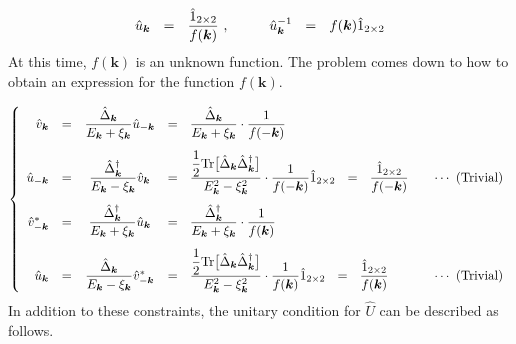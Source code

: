 \documentclass[uplatex,a4j,12pt,dvipdfmx]{jsarticle}
\begin{document}
\begin{eqnarray}
	\hat{u}_{\bm{k}}
	\ \ = \ \
	\dfrac{ \hat{1}_{2 \times 2} }{ f(\bm{k}) }
	\ ,
	\hspace{10mm}
	\hat{u}_{\bm{k}}^{-1}
	\ \ = \ \
	f({\bm{k}}) \hat{1}_{2 \times 2}
\end{eqnarray}
%
At this time, $f(\bm{k})$ is an unknown function.
The problem comes down to how to obtain an expression for the function $f(\bm{k})$.

\begin{eqnarray}
	\left\{
	\begin{array}{rccll}
		\hat{v}_{\bm{k}}
		 & =                               &
		\dfrac{ \hat{\Delta}_{\bm{k}} }{ E_{\bm{k}} + \xi_{\bm{k}} } \hat{u}_{-\bm{k}}
		 &
		= \ \
		\dfrac{ \hat{\Delta}_{\bm{k}} }{ E_{\bm{k}} + \xi_{\bm{k}} } \cdot \dfrac{1}{f(-\bm{k})}
		\\[5mm]
		\hat{u}_{-\bm{k}}
		 & =                               &
		\dfrac{ \hat{\Delta}^{\dagger}_{\bm{k}} }{ E_{\bm{k}} - \xi_{\bm{k}} } \hat{v}_{\bm{k}}
		 &
		= \ \
		\dfrac{ \dfrac{1}{2} {\rm Tr} \big[ \hat{\Delta}_{\bm{k}} \hat{\Delta}^{\dagger}_{\bm{k}} \big] }{ E^{2}_{\bm{k}} - \xi^{2}_{\bm{k}} } \cdot \dfrac{1}{f(-\bm{k})}
		\hat{1}_{2 \times 2}
		\ \ = \ \
		\dfrac{ \hat{1}_{2 \times 2} }{ f(-\bm{k}) }
		 & \ \ \ \cdots \ \text{(Trivial)}
		\\[5mm]
		\hat{v}_{-\bm{k}}^{*}
		 & =                               &
		\dfrac{ \hat{\Delta}^{\dagger}_{\bm{k}} }{ E_{\bm{k}} + \xi_{\bm{k}} } \hat{u}_{\bm{k}}
		 &
		= \ \
		\dfrac{ \hat{\Delta}^{\dagger}_{\bm{k}} }{ E_{\bm{k}} + \xi_{\bm{k}} } \cdot \dfrac{1}{f(\bm{k})}
		\\[5mm]
		\hat{u}_{\bm{k}}
		 & =                               &
		\dfrac{ \hat{\Delta}_{\bm{k}} }{ E_{\bm{k}} - \xi_{\bm{k}} }
		\hat{v}_{-\bm{k}}^{*}
		 &
		= \ \
		\dfrac{ \dfrac{1}{2} {\rm Tr} \big[ \hat{\Delta}_{\bm{k}} \hat{\Delta}^{\dagger}_{\bm{k}} \big] }{ E^{2}_{\bm{k}} - \xi^{2}_{\bm{k}} } \cdot \dfrac{1}{f(\bm{k})}
		\hat{1}_{2 \times 2}
		\ \ = \ \
		\dfrac{ \hat{1}_{2 \times 2} }{ f(\bm{k}) }
		 & \ \ \ \cdots \ \text{(Trivial)}
	\end{array}
	\right.
\end{eqnarray}
%
In addition to these constraints, the unitary condition for $\hat{U}$ can be described as follows.
\end{document}
